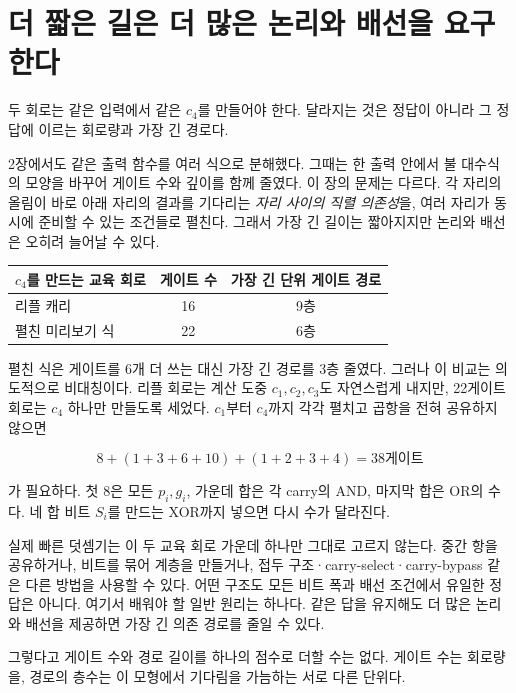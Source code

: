 \section{더 짧은 길은 더 많은 논리와 배선을 요구한다}

두 회로는 같은 입력에서 같은 \(c_4\)를 만들어야 한다. 달라지는 것은 정답이 아니라 그 정답에 이르는 회로량과 가장 긴 경로다.

2장에서도 같은 출력 함수를 여러 식으로 분해했다. 그때는 한 출력 안에서 불 대수식의 모양을 바꾸어 게이트 수와 깊이를 함께 줄였다. 이 장의 문제는 다르다. 각 자리의 올림이 바로 아래 자리의 결과를 기다리는 \emph{자리 사이의 직렬 의존성}을, 여러 자리가 동시에 준비할 수 있는 조건들로 펼친다. 그래서 가장 긴 길이는 짧아지지만 논리와 배선은 오히려 늘어날 수 있다.

\begin{center}
\small
\begin{tabular}{lcc}
\toprule
\sffamily\bfseries \(c_4\)를 만드는 교육 회로 &
\sffamily\bfseries 게이트 수 &
\sffamily\bfseries 가장 긴 단위 게이트 경로 \\
\midrule
리플 캐리 & 16 & 9층 \\
펼친 미리보기 식 & 22 & 6층 \\
\bottomrule
\end{tabular}
\end{center}

펼친 식은 게이트를 6개 더 쓰는 대신 가장 긴 경로를 3층 줄였다. 그러나 이 비교는 의도적으로 비대칭이다. 리플 회로는 계산 도중 \(c_1,c_2,c_3\)도 자연스럽게 내지만, 22게이트 회로는 \(c_4\) 하나만 만들도록 세었다. \(c_1\)부터 \(c_4\)까지 각각 펼치고 곱항을 전혀 공유하지 않으면

\[
  8+(1+3+6+10)+(1+2+3+4)=38\text{게이트}
\]

가 필요하다. 첫 8은 모든 \(p_i,g_i\), 가운데 합은 각 carry의 AND, 마지막 합은 OR의 수다. 네 합 비트 \(S_i\)를 만드는 XOR까지 넣으면 다시 수가 달라진다.

실제 빠른 덧셈기는 이 두 교육 회로 가운데 하나만 그대로 고르지 않는다. 중간 항을 공유하거나, 비트를 묶어 계층을 만들거나, 접두 구조·carry-select·carry-bypass 같은 다른 방법을 사용할 수 있다\parencite{mit6004designtradeoffs,mit6111arithmetic}. 어떤 구조도 모든 비트 폭과 배선 조건에서 유일한 정답은 아니다. 여기서 배워야 할 일반 원리는 하나다. 같은 답을 유지해도 더 많은 논리와 배선을 제공하면 가장 긴 의존 경로를 줄일 수 있다.

그렇다고 게이트 수와 경로 길이를 하나의 점수로 더할 수는 없다. 게이트 수는 회로량을, 경로의 층수는 이 모형에서 기다림을 가늠하는 서로 다른 단위다.


